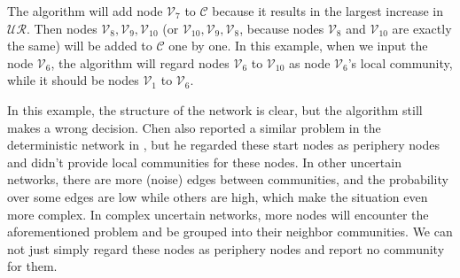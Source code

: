 \documentclass[\main/thesis.tex]{subfiles}
\begin{document}
The algorithm will add node $\mathcal{V}_7$ to $\mathcal{C}$ because it results in the largest increase in $\mathcal{UR}$. Then nodes $\mathcal{V}_8, \mathcal{V}_9, \mathcal{V}_{10}$ (or $\mathcal{V}_{10}, \mathcal{V}_9, \mathcal{V}_{8}$, because nodes $\mathcal{V}_8$ and $\mathcal{V}_{10}$ are exactly the same) will be added to $\mathcal{C}$ one by one. In this example, when we input the node $\mathcal{V}_6$, the algorithm will regard nodes $\mathcal{V}_6$ to $\mathcal{V}_{10}$ as node $\mathcal{V}_6$'s local community, while it should be nodes $\mathcal{V}_1$ to $\mathcal{V}_6$.

In this example, the structure of the network is clear, but the algorithm still makes a wrong decision. Chen also reported a similar problem in the deterministic network in \cite{chen2009local}, but he regarded these start nodes as periphery nodes and didn't provide local communities for these nodes. In other uncertain networks, there are more (noise) edges between communities, and the probability over some edges are low while others are high, which make the situation even more complex. In complex uncertain networks, more nodes will encounter the aforementioned problem and be grouped into their neighbor communities. We can not just simply regard these nodes as periphery nodes and report no community for them.
\end{document}
